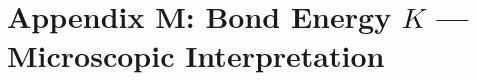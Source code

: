 \documentclass[11pt,a4paper]{article}
\begin{document}
%
%

\section{Appendix M: Bond Energy $K$ --- Microscopic Interpretation}
\label{app:K_derivation}
\end{document}

